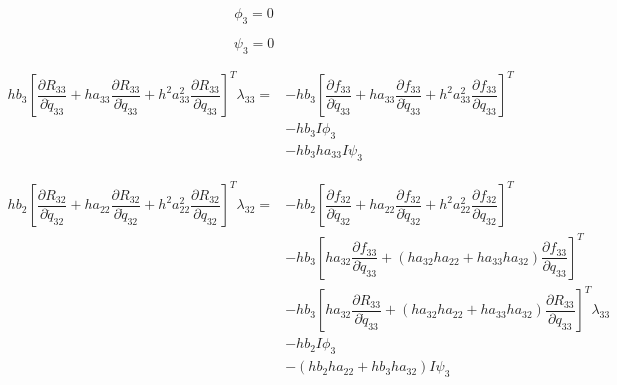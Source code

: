 \documentclass[10pt,letter]{book}
\newcommand{\pd}[2]{\dfrac{\partial #1}{\partial #2}}
\begin{document}
     \begin{equation}
       \phi_3 = 0
     \end{equation}

     \begin{equation}
       \psi_3 = 0
     \end{equation}

     \begin{equation}
       \begin{split}
         hb_3\left[\pd{R_{33}}{\ddot{q}_{33}} + ha_{33}\pd{R_{33}}{\dot{q}_{33}} + h^2a_{33}^2 \pd{R_{33}}{{q}_{33}} \right]^T \lambda_{33} = & - hb_3 \left[\pd{f_{33}}{\ddot{q}_{33}} + ha_{33}\pd{f_{33}}{\dot{q}_{33}} + h^2a_{33}^2 \pd{f_{33}}{{q}_{33}} \right]^T \\ 
         & - hb_3 I \phi_3 \\ 
         & - hb_3ha_{33} I  \psi_3
       \end{split}
     \end{equation}

     \begin{equation}
       \begin{split}
         hb_2\left[\pd{R_{32}}{\ddot{q}_{32}} + ha_{22}\pd{R_{32}}{\dot{q}_{32}} + h^2a_{22}^2 \pd{R_{32}}{{q}_{32}} \right]^T \lambda_{32} = & - hb_2 \left[\pd{f_{32}}{\ddot{q}_{32}} + ha_{22}\pd{f_{32}}{\dot{q}_{32}} + h^2a_{22}^2 \pd{f_{32}}{{q}_{32}} \right]^T \\ 
         & - hb_3 \left[ha_{32}\pd{f_{33}}{\dot{q}_{33}} + (ha_{32}ha_{22} + ha_{33}ha_{32}) \pd{f_{33}}{{q}_{33}} \right]^T \\  
         & - hb_3 \left[ha_{32}\pd{R_{33}}{\dot{q}_{33}} + (ha_{32}ha_{22} + ha_{33}ha_{32}) \pd{R_{33}}{{q}_{33}} \right]^T\lambda_{33} \\  
         & - hb_2 I \phi_3 \\ 
         & - (hb_2ha_{22} + hb_3 ha_{32}) I  \psi_3
       \end{split}
     \end{equation}
\end{document}
